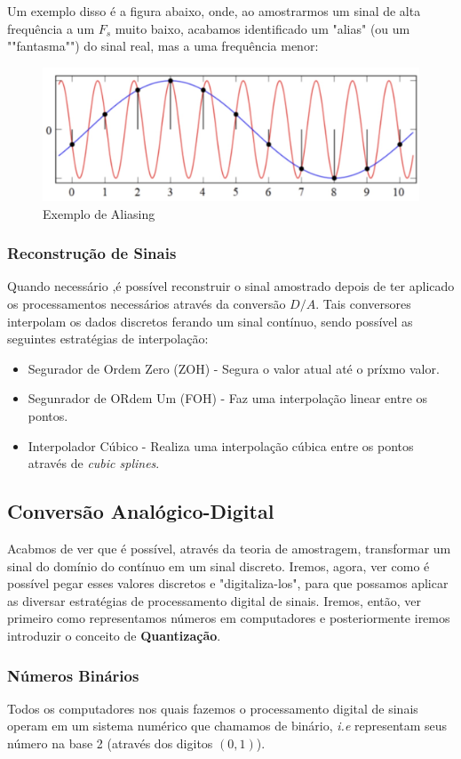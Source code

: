 \documentclass{article}
\begin{document}
Um exemplo disso é a figura abaixo, onde, ao amostrarmos um sinal de alta frequência a um $F_s$ muito baixo, acabamos identificado um "alias" (ou um ""fantasma"") do sinal real, mas a uma frequência menor:

\begin{figure}[h!]
    \centering
    \includegraphics[width=.5\textwidth]{imgs/aliasing.jpeg}
    \caption{Exemplo de Aliasing}
    \label{fig:aliasing}
\end{figure}

\subsubsection{Reconstrução de Sinais}
Quando necessário ,é possível reconstruir o sinal amostrado depois de ter aplicado os processamentos necessários através da conversão $D/A$. Tais conversores interpolam os dados discretos ferando um sinal contínuo, sendo possível as seguintes estratégias de interpolação:
\begin{itemize}
    \item Segurador de Ordem Zero (ZOH) - Segura o valor atual até o príxmo valor.
    \item Segunrador de ORdem Um (FOH) - Faz uma interpolação linear entre os pontos.
    \item Interpolador Cúbico - Realiza uma interpolação cúbica entre os pontos através de \emph{cubic splines}.
\end{itemize}

\subsection{Conversão Analógico-Digital}
Acabmos de ver que é possível, através da teoria de amostragem, transformar um sinal do domínio do contínuo em um sinal discreto. Iremos, agora, ver como é possível pegar esses valores discretos e "digitaliza-los", para que possamos aplicar as diversar estratégias de processamento digital de sinais. Iremos, então, ver primeiro como representamos números em computadores e posteriormente iremos introduzir o conceito de \textbf{Quantização}.

\subsubsection{Números Binários}
Todos os computadores nos quais fazemos o processamento digital de sinais operam em um sistema numérico que chamamos de binário, \emph{i.e} representam seus número na base 2 (através dos digitos $(0,1)$).
\end{document}
